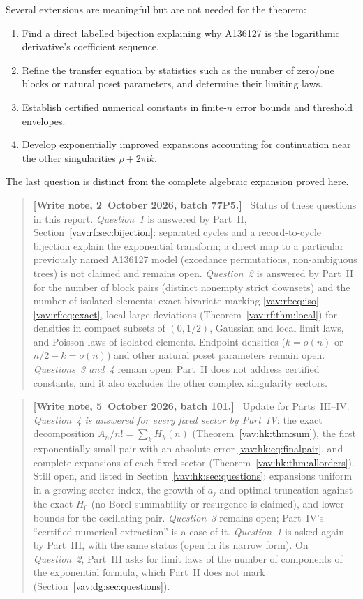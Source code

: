 \documentclass[11pt]{article}
\theoremstyle{remark}\newtheorem{remark}[theorem]{Remark}
\newcommand{\ii}{\mathrm i}
\newenvironment{writenote}{\begin{quote}\small\raggedright\textbf{[Write note, 2~October 2026, batch 77P5.]}\ }{\end{quote}}
\newenvironment{writenoteb}{\begin{quote}\small\raggedright\textbf{[Write note, 5~October 2026, batch 101.]}\ }{\end{quote}}
\begin{document}
Several extensions are meaningful but are not needed for the theorem:
\begin{enumerate}
\item Find a direct labelled bijection explaining why A136127 is the
logarithmic derivative's coefficient sequence.
\item Refine the transfer equation by statistics such as the number
of zero/one blocks or natural poset parameters, and determine their
limiting laws.
\item Establish certified numerical constants in finite-$n$ error
bounds and threshold envelopes.
\item Develop exponentially improved expansions accounting for
continuation near the other singularities $\rho+2\pi\ii k$.
\end{enumerate}
The last question is distinct from the complete algebraic expansion
proved here.
\begin{writenote}
Status of these questions in this report. \emph{Question~1} is answered by
Part~II, Section~\ref{vav:rf:sec:bijection}: separated cycles and a
record-to-cycle bijection explain the exponential transform; a direct map
to a particular previously named A136127 model (excedance permutations,
non-ambiguous trees) is not claimed and remains open. \emph{Question~2} is
answered by Part~II for the number of block pairs (distinct nonempty strict
downsets) and the number of isolated elements: exact bivariate marking
\eqref{vav:rf:eq:iso}--\eqref{vav:rf:eq:exact}, local large deviations
(Theorem~\ref{vav:rf:thm:local}) for densities in compact subsets of
$(0,1/2)$, Gaussian and local limit laws, and Poisson laws of isolated
elements. Endpoint densities ($k=o(n)$ or $n/2-k=o(n)$) and other natural
poset parameters remain open. \emph{Questions~3 and~4} remain open; Part~II
does not address certified constants, and it also excludes the other
complex singularity sectors.
\end{writenote}
\begin{writenoteb}
Update for Parts~III--IV. \emph{Question~4 is answered for every fixed
sector by Part~IV}: the exact decomposition $A_n/n!=\sum_kH_k(n)$
(Theorem~\ref{vav:hk:thm:sum}), the first exponentially small pair with an
absolute error \eqref{vav:hk:eq:finalpair}, and complete expansions of each
fixed sector (Theorem~\ref{vav:hk:thm:allorders}). Still open, and listed in
Section~\ref{vav:hk:sec:questions}: expansions uniform in a growing sector
index, the growth of $a_j$ and optimal truncation against the exact $H_0$
(no Borel summability or resurgence is claimed), and lower bounds for the
oscillating pair. \emph{Question~3} remains open; Part~IV's
``certified numerical extraction'' is a case of it. \emph{Question~1} is
asked again by Part~III, with the same status (open in its narrow form).
On \emph{Question~2}, Part~III asks for limit laws of the number of
components of the exponential formula, which Part~II does not mark
(Section~\ref{vav:dg:sec:questions}).
\end{writenoteb}
\end{document}
